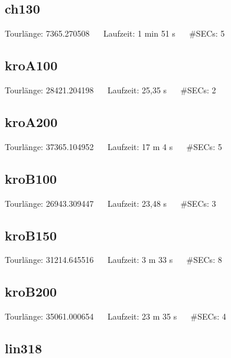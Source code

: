 \documentclass[a4paper, 10pt, ngerman]{article}
\begin{document}
\subsection{ch130}



\noindent Tourlänge: 7365.270508 $\quad$ Laufzeit: 1 min 51 s $\quad$ \#SECs: 5

\subsection{kroA100}



\noindent Tourlänge: 28421.204198 $\quad$ Laufzeit: 25,35 s $\quad$ \#SECs: 2 

\subsection{kroA200}



\noindent Tourlänge: 37365.104952 $\quad$ Laufzeit: 17 m 4 s $\quad$ \#SECs: 5 

\subsection{kroB100}



\noindent Tourlänge: 26943.309447 $\quad$ Laufzeit: 23,48 s $\quad$ \#SECs: 3 

\subsection{kroB150}



\noindent Tourlänge: 31214.645516 $\quad$ Laufzeit: 3 m 33 s $\quad$ \#SECs: 8

\subsection{kroB200}



\noindent Tourlänge: 35061.000654 $\quad$ Laufzeit: 23 m 35 s $\quad$ \#SECs: 4 

\subsection{lin318}
\end{document}
